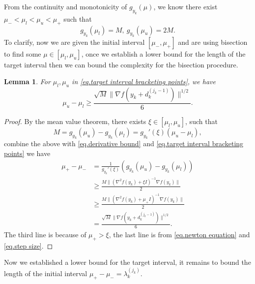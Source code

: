 \documentclass{article}
\theoremstyle{plain}
\newtheorem{lemma}[theorem]{Lemma}
\theoremstyle{definition}
\theoremstyle{remark}
\begin{document}
From the continuity and monotonicity of $g_{y_k}(\mu)$, we know there exist $\mu_-<\mu_l<\mu_u<\mu_+$ such that
\begin{equation}\label{eq.target interval bracketing points}
    g_{y_k}(\mu_l)=M, \ g_{y_k}(\mu_u)=2M.
\end{equation}
To clarify, now we are given the initial interval $[\mu_-,\mu_+]$ and are using bisection to find some $\mu\in[\mu_l,\mu_u]$, once we establish a lower bound for the length of the target interval then we can bound the complexity for the bisection procedure.
\begin{lemma}
    \label{lem.bound target interval}
    For $\mu_l,\mu_u$ in \eqref{eq.target interval bracketing points}, we have
    \begin{equation}
        \label{eq.bound target interval}
        \mu_u-\mu_l \geq \frac{\sqrt{M}\|\nabla f(y_k+d_k^{(j_k-1)})\|^{1/2}}{6}.
    \end{equation}
\end{lemma}
\begin{proof}
    By the mean value theorem, there exists $\xi\in \left [\mu_l,\mu_u\right]$, such that
    \begin{equation*}
        M=g_{y_k}(\mu_u)-g_{y_k}(\mu_l) = g_{y_k}'(\xi)(\mu_u-\mu_l),
    \end{equation*}
    combine the above with \eqref{eq.derivative bound} and \eqref{eq.target interval bracketing points} we have
    \begin{equation*}
        \begin{aligned}
            \mu_+-\mu_- & =  \frac{1}{g_{y_k}'(\xi)}\left(g_{y_k}(\mu_u)-g_{y_k}(\mu_l)\right)           \\
                        & \geq \frac{M\|\left (\nabla ^2 f(y_k)+\xi I \right )^{-1}\nabla f(y_k)\|}{2}   \\
                        & \geq \frac{M\|\left (\nabla ^2 f(y_k)+\mu_+ I \right )^{-1}\nabla f(y_k)\|}{2} \\
                        & = \frac{\sqrt{M}\|\nabla f(y_k+d_k^{(j_k-1)})\|^{1/2}}{6}.
        \end{aligned}
    \end{equation*}
    The third line is because of $\mu_+ >\xi$, the last line is from \eqref{eq.newton equation} and \eqref{eq.step size}.
\end{proof}
Now we established a lower bound for the target interval, it remains to bound the length of the initial interval $\mu_+ -\mu_- = \lambda_k^{(j_k)}$.
\end{document}
